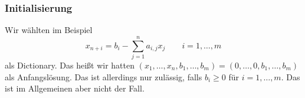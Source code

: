 \subsubsection{Initialisierung}
Wir wählten im Beispiel
\[ x_{n+i} = b_i - \sum_{j=1}^{n} a_{i,j} x_j \qquad i= 1, \ldots, m \]
als Dictionary. Das heißt wir hatten $(x_1, \ldots, x_n, b_1, \ldots, b_m) = (0, \ldots, 0, b_1, \ldots, b_m)$ als Anfangslösung. Das ist allerdings nur zulässig, falls $b_i \ge 0$ für $i = 1, \ldots, m$. Das ist im Allgemeinen aber nicht der Fall.


%
%
%

